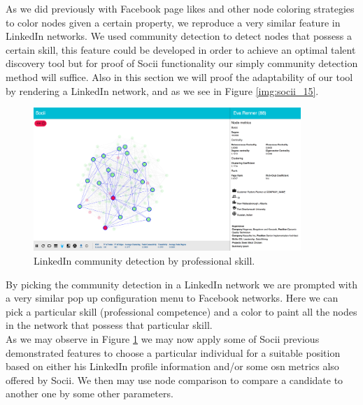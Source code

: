 As we did previously with Facebook page likes and other node coloring strategies to color nodes given a certain property, we reproduce a very similar feature in LinkedIn networks. We used community detection to detect nodes that possess a certain skill, this feature could be developed in order to achieve an optimal talent discovery tool but for proof of Socii functionality our simply community detection method will suffice. Also in this section we will proof the adaptability of our tool by rendering a LinkedIn network, and as we see in Figure \ref{img:socii_15}.\\

\begin{figure}[h!]
\begin{center}
  \hspace*{-0.8in}
  \includegraphics[width=0.9\textwidth]{img/socii/socii_16.png}
\end{center}
\caption{\label{img:socii_16} LinkedIn community detection by professional skill.}
\end{figure}

\indent By picking the community detection in a LinkedIn network we are prompted with a very similar pop up configuration menu to Facebook networks. Here we can pick a particular skill (professional competence) and a color to paint all the nodes in the network that possess that particular skill.\\
\indent As we may observe in Figure \ref{img:socii_16} we may now apply some of Socii previous demonstrated features to choose a particular individual for a suitable position based on either his LinkedIn profile information and/or some \gls{osn} metrics also offered by Socii. We then may use node comparison to compare a candidate to another one by some other parameters.
